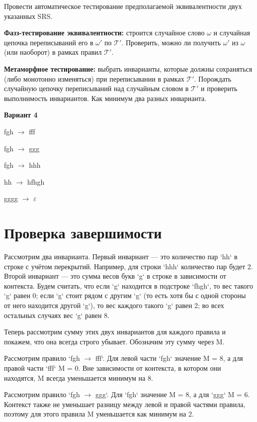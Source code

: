 \documentclass[a4paper, 14pt]{extarticle}
\begin{document}
Провести автоматическое тестирование предполагаемой эквивалентности двух указанных SRS.

\textbf{Фазз-тестирование эквивалентности:} строится случайное слово $\omega$ и случайная цепочка переписываний его в $\omega'$ по $\mathcal{T}'$. Проверить, можно ли получить $\omega'$ из $\omega$ (или наоборот) в рамках правил $\mathcal{T}'$.

\textbf{Метаморфное тестирование:} выбрать инварианты, которые должны сохраняться (либо монотонно изменяться) при переписывании в рамках $\mathcal{T}'$. Порождать случайную цепочку переписываний над случайным словом в $\mathcal{T}'$ и проверить выполнимость инвариантов. Как минимум два разных инварианта.

\textbf{Вариант 4}

fgh $\rightarrow$ fff

fgh $\rightarrow$ ggg

fgh $\rightarrow$ hhh

hh $\rightarrow$ hfhgh

gggg $\rightarrow$ $\varepsilon$


\section{Проверка завершимости}

Рассмотрим два инварианта. Первый инвариант — это количество пар `hh` в строке с учётом перекрытий. Например, для строки `hhh` количество пар будет 2. Второй инвариант — это сумма весов букв `g` в строке в зависимости от контекста. Будем считать, что если `g` находится в подстроке `fhgh`, то вес такого `g` равен 0; если `g` стоит рядом с другим `g` (то есть хотя бы с одной стороны от него находится другой `g`), то вес каждого такого `g` равен 2; во всех остальных случаях вес `g` равен 8. 

Теперь рассмотрим сумму этих двух инвариантов для каждого правила и покажем, что она всегда строго убывает. Обозначим эту сумму через M.

Рассмотрим правило `fgh $\rightarrow$ fff`. Для левой части `fgh` значение M = 8, а для правой части `fff` M = 0. Вне зависимости от контекста, в котором они находятся, M всегда уменьшается минимум на 8.

Рассмотрим правило `fgh $\rightarrow$ ggg`. Для `fgh` значение M = 8, а для `ggg` M = 6. Контекст также не уменьшает разницу между левой и правой частями правила, поэтому для этого правила M уменьшается как минимум на 2.
\end{document}
